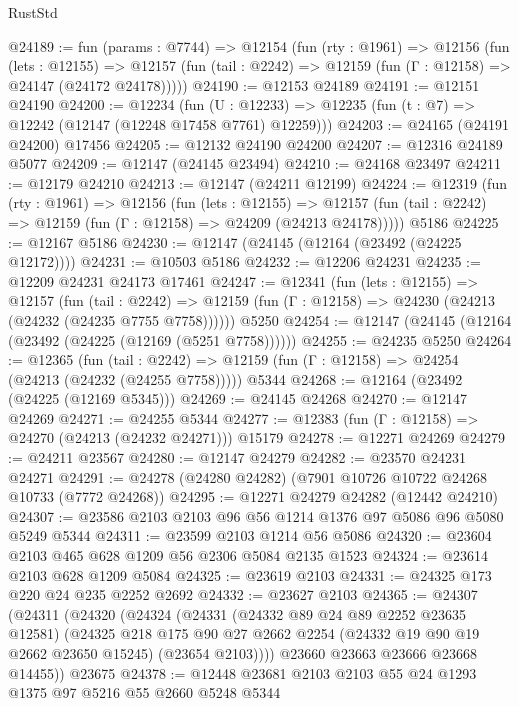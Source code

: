 \begin{lexlean}{RustStd}
\begin{coremodule}
@24189 := fun (params : @7744) =>
  @12154
    (fun (rty : @1961) =>
    @12156
      (fun (lets : @12155) =>
      @12157 (fun (tail : @2242) => @12159 (fun (Γ : @12158) => @24147 (@24172 @24178)))))
@24190 := @12153 @24189
@24191 := @12151 @24190
@24200 := @12234
    (fun (U : @12233) => @12235 (fun (t : @7) => @12242 (@12147 (@12248 @17458 @7761) @12259)))
@24203 := @24165 (@24191 @24200) @17456
@24205 := @12132 @24190 @24200
@24207 := @12316 @24189 @5077
@24209 := @12147 (@24145 @23494)
@24210 := @24168 @23497
@24211 := @12179 @24210
@24213 := @12147 (@24211 @12199)
@24224 := @12319
    (fun (rty : @1961) =>
    @12156
      (fun (lets : @12155) =>
      @12157 (fun (tail : @2242) => @12159 (fun (Γ : @12158) => @24209 (@24213 @24178)))))
    @5186
@24225 := @12167 @5186
@24230 := @12147 (@24145 (@12164 (@23492 (@24225 @12172))))
@24231 := @10503 @5186
@24232 := @12206 @24231
@24235 := @12209 @24231 @24173 @17461
@24247 := @12341
    (fun (lets : @12155) =>
    @12157
      (fun (tail : @2242) =>
      @12159 (fun (Γ : @12158) => @24230 (@24213 (@24232 (@24235 @7755 @7758))))))
    @5250
@24254 := @12147 (@24145 (@12164 (@23492 (@24225 (@12169 (@5251 @7758))))))
@24255 := @24235 @5250
@24264 := @12365
    (fun (tail : @2242) => @12159 (fun (Γ : @12158) => @24254 (@24213 (@24232 (@24255 @7758)))))
    @5344
@24268 := @12164 (@23492 (@24225 (@12169 @5345)))
@24269 := @24145 @24268
@24270 := @12147 @24269
@24271 := @24255 @5344
@24277 := @12383 (fun (Γ : @12158) => @24270 (@24213 (@24232 @24271))) @15179
@24278 := @12271 @24269
@24279 := @24211 @23567
@24280 := @12147 @24279
@24282 := @23570 @24231 @24271
@24291 := @24278 (@24280 @24282) (@7901 @10726 @10722 @24268 @10733 (@7772 @24268))
@24295 := @12271 @24279 @24282 (@12442 @24210)
@24307 := @23586 @2103 @2103 @96 @56 @1214 @1376 @97 @5086 @96 @5080 @5249 @5344
@24311 := @23599 @2103 @1214 @56 @5086
@24320 := @23604 @2103 @465 @628 @1209 @56 @2306 @5084 @2135 @1523
@24324 := @23614 @2103 @628 @1209 @5084
@24325 := @23619 @2103
@24331 := @24325 @173 @220 @24 @235 @2252 @2692
@24332 := @23627 @2103
@24365 := @24307
    (@24311
      (@24320
        (@24324
          (@24331
            (@24332 @89 @24 @89 @2252 @23635 @12581)
            (@24325
              @218
              @175
              @90
              @27
              @2662
              @2254
              (@24332 @19 @90 @19 @2662 @23650 @15245)
              (@23654 @2103))))
        @23660
        @23663
        @23666
        @23668
        @14455))
    @23675
@24378 := @12448 @23681 @2103 @2103 @55 @24 @1293 @1375 @97 @5216 @55 @2660 @5248 @5344

\end{coremodule}
\end{lexlean}
